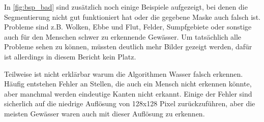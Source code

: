 In \autoref{fig:bsp_bad} sind zusätzlich noch einige Beispiele aufgezeigt, 
bei denen die Segmentierung nicht gut funktioniert hat 
oder die gegebene Maske auch falsch ist.
Probleme sind z.B. Wolken, Ebbe und Flut, Felder, Sumpfgebiete oder sonstige auch für den Menschen schwer zu erkennende Gewässer.
Um tatsächlich alle Probleme sehen zu können, müssten deutlich mehr Bilder gezeigt werden, dafür ist allerdings in diesem Bericht kein Platz.

Teilweise ist nicht erklärbar warum die Algorithmen Wasser falsch erkennen.
Häufig entstehen Fehler an Stellen, die auch ein Mensch nicht erkennen könnte, aber manchmal werden eindeutige Kanten nicht erkannt.
Einige der Fehler sind sicherlich auf die niedrige Auflösung von 128x128 Pixel zurückzuführen, aber die meisten Gewässer waren auch mit dieser Auflösung zu erkennen.
